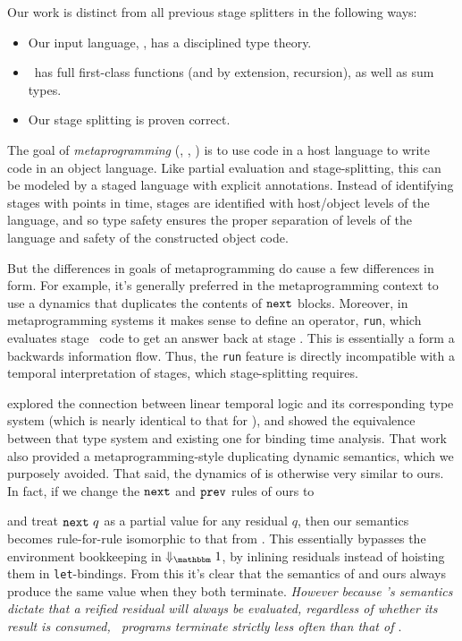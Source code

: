 Our work is distinct from all previous stage splitters in the following ways:
\begin{itemize}
\item Our input language, \lang, has a disciplined type theory.
\item \lang\ has full first-class functions (and by extension, recursion), as well as sum types.
\item Our stage splitting is proven correct.
\end{itemize}

The goal of {\em metaprogramming} (\cite{taha-thesis-99}, \cite{devito13}, \cite{davies01}) is 
to use code in a host language to write code in an object language.
Like partial evaluation and stage-splitting, this can be modeled by a staged language with explicit annotations.
Instead of identifying stages with points in time, stages are identified with host/object levels of the language,
and so type safety ensures the proper separation of levels of the language and safety of the constructed object code.

But the differences in goals of metaprogramming do cause a few differences in form.
For example, it's generally preferred in the metaprogramming context to use 
a dynamics that duplicates the contents of ${\tt next}$ blocks.
Moreover, in metaprogramming systems it makes sense to define an operator, \texttt{run}, 
which evaluates stage \bbtwo\ code to get an answer back at stage \bbone.
This is essentially a form a backwards information flow.
Thus, the \texttt{run} feature is directly incompatible with a temporal interpretation of stages,
which stage-splitting requires.

\cite{davies96} explored the connection between linear temporal logic and its corresponding type system (which is nearly identical to that for \lang), 
and showed the equivalence between that type system and existing one for binding time analysis. 
That work also provided a metaprogramming-style duplicating dynamic semantics, which we purposely avoided.
That said, the dynamics of \cite{davies96} is otherwise very similar to ours.
In fact, if we change the ${\tt next}$ and ${\tt prev}$ rules of ours to 
and treat ${\tt next}~q$ as a partial value for any residual $q$,
then our semantics becomes rule-for-rule isomorphic to that from \cite{davies96}. This essentially bypasses the
environment bookkeeping in $\redonesym$, by inlining residuals instead of
hoisting them in \verb|let|-bindings.
From this it's clear that the semantics of \cite{davies96} and ours always produce the same value when they both terminate.
{\em However because \lang's semantics dictate that a reified residual will always be evaluated, regardless of whether its result is consumed, \lang\ programs terminate strictly less often than that of \cite{davies96}}.


